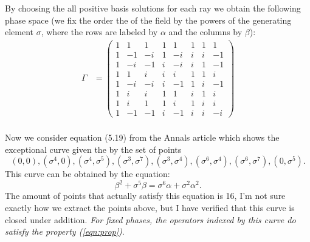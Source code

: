 \documentclass[a4paper]{article}
\begin{document}
  By choosing the all positive basis solutions for each ray
  we obtain the following phase space (we fix the order the
  of the field by the powers of the generating element
  $\sigma$, where the rows are labeled by $\alpha$ and the
  columns by $\beta$):
  \begin{align}
    \Gamma
    &=
    \displaystyle \left(\begin{array}{rrrrrrrr}
    1 & 1 & 1 & 1 & 1 & 1 & 1 & 1 \\
    1 & -1 & -i & 1 & -i & i & i & -1 \\
    1 & -i & -1 & i & -i & i & 1 & -1 \\
    1 & 1 & i & i & i & 1 & 1 & i \\
    1 & -i & -i & i & -1 & 1 & i & -1 \\
    1 & i & i & 1 & 1 & i & 1 & i \\
    1 & i & 1 & 1 & i & 1 & i & i \\
    1 & -1 & -1 & i & -1 & i & i & -i
    \end{array}\right) \\
  \end{align}

  Now we consider equation (5.19) from the Annals article
  which shows the exceptional curve given the by the set of
  points
  \begin{equation}
    (0,0), (\sigma^4,0), (\sigma^4, \sigma^5), (\sigma^3,
    \sigma^7), (\sigma^3, \sigma^4), (\sigma^6, \sigma^4),
    (\sigma^6, \sigma^7), (0, \sigma^5).
  \end{equation}
  This curve can be obtained by the equation:
  \begin{equation}
    \beta^2 + \sigma^5 \beta
    = \sigma^6 \alpha + \sigma^2 \alpha^2.
  \end{equation}
  The amount of points that actually satisfy this equation
  is 16, I'm not sure exactly how we extract the points
  above, but I have verified that this curve is closed under
  addition. \textit{For fixed phases, the operators indexed
    by this curve do satisfy the property (\ref{eqn:prop})}.
\end{document}
